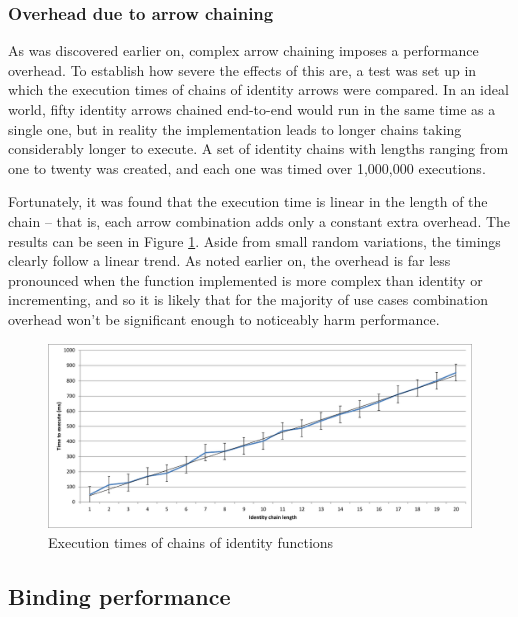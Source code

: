 \documentclass[12pt,twoside,notitlepage]{report}
\begin{document}
\subsubsection{Overhead due to arrow chaining}
\label{sec:arrow_chaining_overhead}

As was discovered earlier on, complex arrow chaining imposes a performance overhead. To establish how severe the effects of this are, a test was set up in which the execution times of chains of identity arrows were compared. In an ideal world, fifty identity arrows chained end-to-end would run in the same time as a single one, but in reality the implementation leads to longer chains taking considerably longer to execute. A set of identity chains with lengths ranging from one to twenty was created, and each one was timed over 1,000,000 executions.

Fortunately, it was found that the execution time is linear in the length of the chain -- that is, each arrow combination adds only a constant extra overhead. The results can be seen in Figure \ref{fig:arrow_chaining_overhead}. Aside from small random variations, the timings clearly follow a linear trend. As noted earlier on, the overhead is far less pronounced when the function implemented is more complex than identity or incrementing, and so it is likely that for the majority of use cases combination overhead won't be significant enough to noticeably harm performance.

\begin{figure}[!ht]
  \centering
  \includegraphics[width=\textwidth]{fig/IdentityChains.pdf}
  \caption{Execution times of chains of identity functions}
  \label{fig:arrow_chaining_overhead}
\end{figure}

\subsection{Binding performance}
\end{document}
